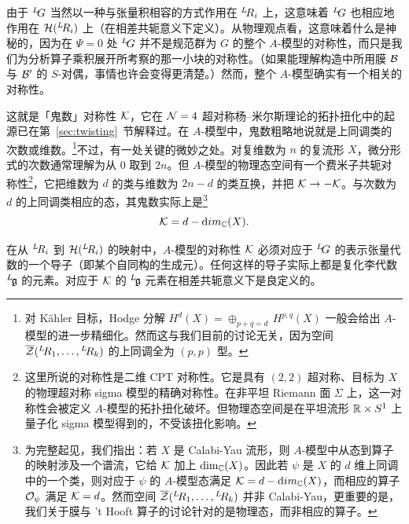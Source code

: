 由于 $^L\negthinspace G$ 当然以一种与张量积相容的方式作用在 $^L\negthinspace R_i$ 上，这意味着 $^L\negthinspace G$ 也相应地作用在 ${\cal H}({}^L\negthinspace R_i)$ 上（在相差共轭意义下定义）。从物理观点看，这意味着什么是神秘的，因为在 $\Psi=0$ 处 $^L\negthinspace G$ 并不是规范群为 $G$ 的整个 $A$-模型的对称性，而只是我们为分析算子乘积展开所考察的那一小块的对称性。（如果能理解构造中所用膜 ${\cal B}$ 与 ${\cal B}'$ 的 $S$-对偶，事情也许会变得更清楚。）然而，整个 $A$-模型确实有一个相关的对称性。

这就是「鬼数」对称性 ${\EUK}$，它在 ${\EUN}=4$ 超对称杨–米尔斯理论的拓扑扭化中的起源已在第~\ref{sec:twisting}~节解释过。在 $A$-模型中，鬼数粗略地说就是上同调类的次数或维数。\footnote{对 Kähler 目标，Hodge 分解 $H^d(X)=\oplus_{p+q=d}\,H^{p,q}(X)$ 一般会给出 $A$-模型的进一步精细化。然而这与我们目前的讨论无关，因为空间 $\bar \EUZ({}^L\negthinspace R_1,\dots,{}^L\neg R_k)$ 的上同调全为 $(p,p)$ 型。}不过，有一处关键的微妙之处。对复维数为 $n$ 的复流形 $X$，微分形式的次数通常理解为从 $0$ 取到 $2n$。但 $A$-模型的物理态空间有一个费米子共轭对称性\footnote{这里所说的对称性是二维 CPT 对称性。它是具有 $(2,2)$ 超对称、目标为 $X$ 的物理超对称 sigma 模型的精确对称性。在非平坦 Riemann 面 $\Sigma$ 上，这一对称性会被定义 $A$-模型的拓扑扭化破坏。但物理态空间是在平坦流形 $\Bbb{R}\times S^1$ 上量子化 sigma 模型得到的，不受该扭化影响。}，它把维数为 $d$ 的类与维数为 $2n-d$ 的类互换，并把 ${\EUK}\to -{\EUK}$。与次数为 $d$ 的上同调类相应的态，其鬼数实际上是\footnote{为完整起见，我们指出：若 $X$ 是 Calabi-Yau 流形，则 $A$-模型中从态到算子的映射涉及一个谱流，它给 ${\EUK}$ 加上 $\dim_{\Bbb{C}}(X)$。因此若 $\psi$ 是 $X$ 的 $d$ 维上同调中的一个类，则对应于 $\psi$ 的 $A$-模型态满足 ${\EUK}=d-{\rm dim}_{\Bbb{C}}(X)$，而相应的算子 ${\EUO}_\psi$ 满足 ${\EUK}=d$。然而空间 $\bar \EUZ({}^L\negthinspace R_1,\dots,{}^L\neg R_k)$ 并非 Calabi-Yau，更重要的是，我们关于膜与 't Hooft 算子的讨论针对的是物理态，而非相应的算子。} %
\setcounter{equation}{27}
\begin{equation}\label{eq:insno}
{\EUK}=d-{\rm dim}_{\Bbb{C}}(X).
\end{equation}

在从 $^L\negthinspace R_i$ 到 ${\cal H}(^L\negthinspace R_i)$ 的映射中，$A$-模型的对称性 ${\EUK}$ 必须对应于 $^L\negthinspace G$ 的表示张量代数的一个导子（即某个自同构的生成元）。任何这样的导子实际上都是复化李代数 $^L\negthinspace \frak{g}$ 的元素。对应于 ${\EUK}$ 的 $^L\negthinspace \frak{g}$ 元素在相差共轭意义下是良定义的。

